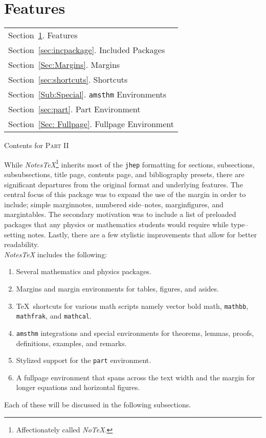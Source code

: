 \section{Features}\label{sec:Features}
\begin{margintable}\vspace{1.4in}\footnotesize
  \begin{tabularx}{\marginparwidth}{|X}
  Section~\ref{sec:Features}. Features\\
  Section~\ref{sec:incpackage}. Included Packages\\
  Section~\ref{Sec:Margins}. Margins\\
  Section~\ref{sec:shortcuts}.  Shortcuts\\
  Section~\ref{Sub:Special}. \texttt{amsthm} Environments\\
  Section~\ref{sec:part}. Part Environment\\
  Section~\ref{Sec: Fullpage}. Fullpage Environment\\
  \end{tabularx}
  \caption{Contents for \textsc{Part II}}
\end{margintable}
While \textit{NotesTeX}\footnote{Affectionately called \textit{NoTeX}.} inherits most of the \texttt{jhep} formatting for sections, subsections, subsubsections, title page, contents page, and bibliography presets, there are significant departures from the original format and underlying features. The central focus of this package was to expand the use of the margin in order to include; simple marginnotes, numbered side--notes, marginfigures, and margintables. The secondary motivation was to include a list of preloaded packages that any physics or mathematics students would require while type--setting notes. Lastly, there are a few stylistic improvements that allow for better readability.\\

\noindent \textit{NotesTeX} includes the following:
\begin{enumerate}
  \item Several mathematics and physics packages.
  \item Margins and margin environments for tables, figures, and asides.
  \item \TeX\ shortcuts for various math scripts namely vector bold math, \texttt{mathbb}, \texttt{mathfrak}, and \texttt{mathcal}.
  \item \texttt{amsthm} integrations and special environments for theorems, lemmas, proofs, definitions, examples, and remarks.\
  \item Stylized support for the \texttt{part} environment.
  \item A fullpage environment that spans across the text width and the margin for longer equations and horizontal figures.
\end{enumerate}
Each of these will be discussed in the following subsections.

